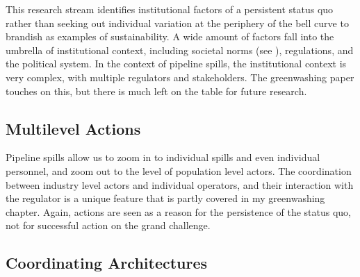 \documentclass{article}
\begin{document}
This research stream identifies institutional factors of a persistent status quo rather than seeking out individual variation at the periphery of the bell curve to brandish as examples of sustainability. A wide amount of factors fall into the umbrella of institutional context, including societal norms (see ), regulations, and the political system. In the context of pipeline spills, the institutional context is very complex, with multiple regulators and stakeholders. The greenwashing paper touches on this, but there is much left on the table for future research.



\subsection*{Multilevel Actions}

Pipeline spills allow us to zoom in to individual spills and even individual personnel, and zoom out to the level of population level actors. The coordination between industry level actors and individual operators, and their interaction with the regulator is a unique feature that is partly covered in my greenwashing chapter. Again, actions are seen as a reason for the persistence of the status quo, not for successful action on the grand challenge.

\subsection*{Coordinating Architectures}
\end{document}
